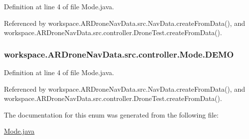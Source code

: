 Definition at line 4 of file Mode.\+java.



Referenced by workspace.\+A\+R\+Drone\+Nav\+Data.\+src.\+Nav\+Data.\+create\+From\+Data(), and workspace.\+A\+R\+Drone\+Nav\+Data.\+src.\+controller.\+Drone\+Test.\+create\+From\+Data().

\hypertarget{enumworkspace_1_1_a_r_drone_nav_data_1_1src_1_1controller_1_1_mode_a09071332c54725b55b8f88c41ec504d1}{}
\subsubsection[{D\+E\+M\+O}]{\setlength{\rightskip}{0pt plus 5cm}workspace.\+A\+R\+Drone\+Nav\+Data.\+src.\+controller.\+Mode.\+D\+E\+M\+O}\label{enumworkspace_1_1_a_r_drone_nav_data_1_1src_1_1controller_1_1_mode_a09071332c54725b55b8f88c41ec504d1}


Definition at line 4 of file Mode.\+java.



Referenced by workspace.\+A\+R\+Drone\+Nav\+Data.\+src.\+Nav\+Data.\+create\+From\+Data(), and workspace.\+A\+R\+Drone\+Nav\+Data.\+src.\+controller.\+Drone\+Test.\+create\+From\+Data().



The documentation for this enum was generated from the following file\+:\begin{DoxyCompactItemize}
\item 
\hyperlink{_mode_8java}{Mode.\+java}\end{DoxyCompactItemize}
